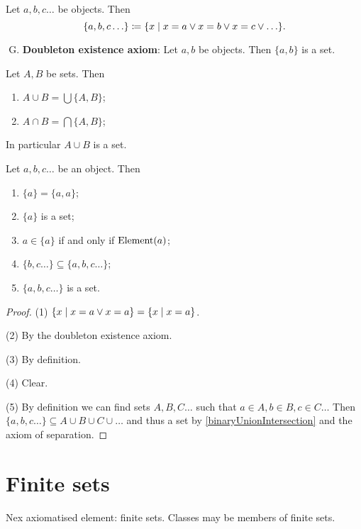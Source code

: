 \begin{definition}
Let $a,b, c \ldots$ be objects. Then
\[ \{a,b, c \ldots\} \defeq \setbuilder{x}{x = a \lor x = b \lor x = c \lor \ldots}. \]
\end{definition}

\begin{enumerate}[(A)] \setcounter{enumi}{6}
\item \textbf{Doubleton existence axiom}: Let $a,b$ be objects. Then $\{a,b\}$ is a set.
\end{enumerate}

\begin{lemma} \label{binaryUnionIntersection}
Let $A,B$ be sets. Then
\begin{enumerate}
\item $A \cup B = \bigcup\{A, B\}$;
\item $A \cap B = \bigcap\{A, B\}$;
\end{enumerate}
In particular $A\cup B$ is a set.
\end{lemma}

\begin{lemma}
Let $a,b, c \ldots$ be an object. Then
\begin{enumerate}
\item $\{a\} = \{a, a\}$;
\item $\{a\}$ is a set;
\item $a\in \{a\}$ \textup{if and only if} $\operatorname{Element}(a)$;
\item $\{b,c \ldots\} \subseteq \{a,b,c \ldots\}$;
\item $\{a,b, c \ldots\}$ is a set.
\end{enumerate}
\end{lemma}
\begin{proof}
(1) $\setbuilder{x}{x = a \lor x = a} = \setbuilder{x}{x = a}$.

(2) By the doubleton existence axiom.

(3) By definition.

(4) Clear.

(5) By definition we can find sets $A,B,C \ldots$ such that $a\in A, b\in B, c\in C \ldots$ Then $\{a,b, c \ldots\} \subseteq A\cup B\cup C \cup \ldots$ and thus a set by \ref{binaryUnionIntersection} and the axiom of separation.
\end{proof}

\section{Finite sets}
Nex axiomatised element: finite sets. Classes may be members of finite sets.

